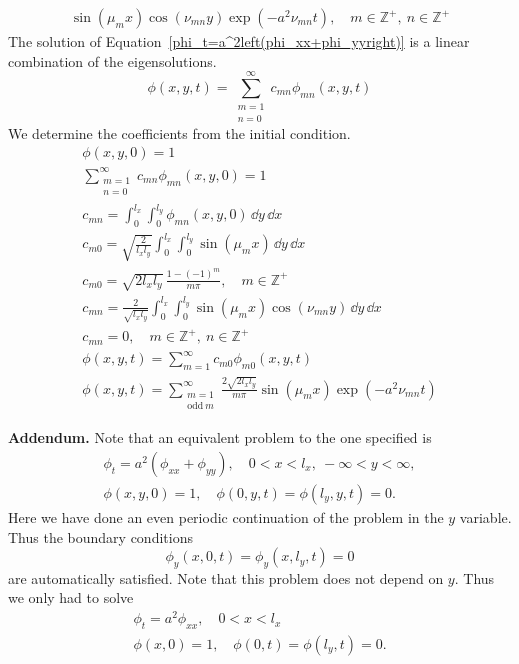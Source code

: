 {\begin{Solution}
\begin{gather*}
    \sin(\mu_m x) \cos(\nu_{m n} y) \exp \left( - a^2 \nu_{m n} t \right),
    \quad m \in \mathbb{Z^+},\ n \in \mathbb{Z}^+
  \end{gather*}
  The solution of Equation~\ref{phi_t=a^2left(phi_xx+phi_yyright)}
  is a linear combination of the eigensolutions.
  \[
  \phi(x,y,t) = \sum_{\substack{m = 1\\n = 0}}^\infty 
  c_{m n} \phi_{m n}(x,y,t)
  \]
  We determine the coefficients from the initial condition.
  \begin{gather*}
    \phi(x,y,0) = 1 \\
    \sum_{\substack{m = 1\\n = 0}}^\infty c_{m n} \phi_{m n}(x,y,0) = 1 \\
    c_{m n} = \int_0^{l_x} \int_0^{l_y} \phi_{m n}(x,y,0) \,\dd y \,\dd x \\
    c_{m 0} = \sqrt{ \frac{ 2 }{ l_x l_y } } \int_0^{l_x} \int_0^{l_y} 
    \sin(\mu_m x) \,\dd y \,\dd x \\
    c_{m 0} = \sqrt{ 2 l_x l_y } \, \frac{ 1 - (-1)^m }{ m \pi },
    \quad m \in \mathbb{Z^+} \\
    c_{m n} = \frac{ 2 }{ \sqrt{ l_x l_y } }\int_0^{l_x} \int_0^{l_y}  
    \sin(\mu_m x) \cos(\nu_{m n} y) \,\dd y \,\dd x \\
    c_{m n} = 0, \quad m \in \mathbb{Z^+},\ n \in \mathbb{Z}^+ \\
    \phi(x,y,t) = \sum_{m = 1}^\infty c_{m 0} \phi_{m 0}(x,y,t) \\
    \boxed{
      \phi(x,y,t) = \sum_{\substack{m = 1\\ \mathrm{odd}\ m}}^\infty 
      \frac{ 2 \sqrt{ 2 l_x l_y } }{ m \pi }
      \sin(\mu_m x) \exp \left( - a^2 \nu_{m n} t \right)
      }
  \end{gather*}

  \textbf{Addendum.}
  Note that an equivalent problem to the one specified is
  \begin{gather*}
    \phi_t = a^2 \left( \phi_{x x} + \phi_{y y} \right), \quad
    0 < x < l_x,\ -\infty < y < \infty, \\
    \phi(x,y,0) = 1, \quad \phi(0,y,t) = \phi(l_y,y,t) = 0.
  \end{gather*}
  Here we have done an even periodic continuation of the problem in the
  $y$ variable.  Thus the boundary conditions 
  \[
  \phi_y(x,0,t) = \phi_y(x,l_y,t) = 0
  \]
  are automatically satisfied.  Note that this problem does not depend 
  on $y$.  Thus we only had to solve
  \begin{gather*}
    \phi_t = a^2 \phi_{x x} , \quad
    0 < x < l_x \\
    \phi(x,0) = 1, \quad \phi(0,t) = \phi(l_y,t) = 0.
  \end{gather*}
\end{Solution}







}

